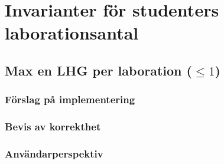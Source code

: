 \section{Invarianter för studenters laborationsantal}

\subsection{Max en LHG per laboration ($\leq 1$)}
\subsubsection{Förslag på implementering}
\subsubsection{Bevis av korrekthet}

\subsubsection{Användarperspektiv}

